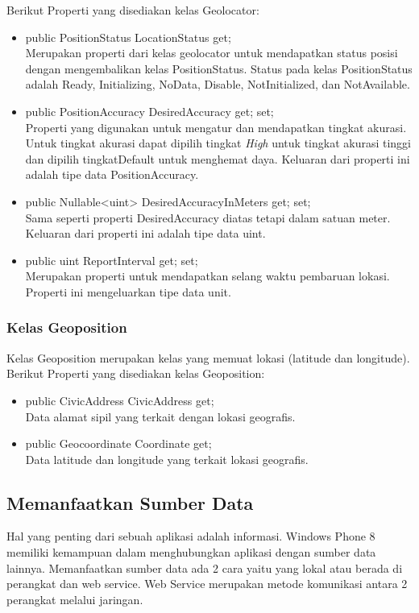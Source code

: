 Berikut Properti yang disediakan kelas Geolocator:
\begin{itemize}
	\item public PositionStatus LocationStatus { get; } \\
		Merupakan properti dari kelas geolocator untuk mendapatkan status posisi dengan mengembalikan kelas PositionStatus. Status pada kelas PositionStatus adalah Ready, Initializing, NoData, Disable, NotInitialized, dan NotAvailable.
	\item public PositionAccuracy DesiredAccuracy { get; set; } \\
		Properti yang digunakan untuk mengatur dan mendapatkan tingkat akurasi. Untuk tingkat akurasi dapat dipilih tingkat \textit{High} untuk tingkat akurasi tinggi dan dipilih tingkat{Default} untuk menghemat daya. Keluaran dari properti ini adalah tipe data PositionAccuracy.
	\item public Nullable<uint> DesiredAccuracyInMeters { get; set; }\\
		Sama seperti properti DesiredAccuracy diatas tetapi dalam satuan meter. Keluaran dari properti ini adalah tipe data uint.
	\item public uint ReportInterval { get; set; } \\
		Merupakan properti untuk mendapatkan selang waktu pembaruan lokasi. Properti ini mengeluarkan tipe data unit.
\end{itemize}

\subsubsection{Kelas Geoposition}
\label{subsubsec:Kelas Geoposition}
\hspace{0.5cm} Kelas Geoposition merupakan kelas yang memuat lokasi (latitude dan longitude).
Berikut Properti yang disediakan kelas Geoposition:
\begin{itemize}
	\item public CivicAddress CivicAddress { get; } \\
		Data alamat sipil yang terkait dengan lokasi geografis.
	\item public Geocoordinate Coordinate { get; } \\
		Data latitude dan longitude yang terkait lokasi geografis.
\end{itemize}

\subsection{Memanfaatkan Sumber Data}
\label{subsec:Memanfaatkan Sumber Data}
\hspace{0.5cm} Hal yang penting dari sebuah aplikasi adalah informasi. Windows Phone 8 memiliki kemampuan dalam menghubungkan aplikasi dengan sumber data lainnya. Memanfaatkan sumber data ada 2 cara yaitu yang lokal atau berada di perangkat dan web service. Web Service merupakan metode komunikasi antara 2 perangkat melalui jaringan. 


